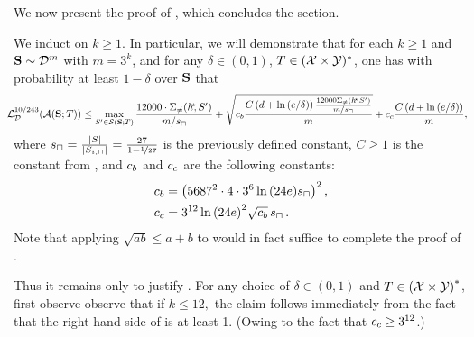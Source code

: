 We now present the proof of , which concludes the section. 

\begin{proofof}{}    
We induct on $ k\geq 1 $. 
In particular, we will demonstrate that for each $ k\geq 1$ and $\mathbf{S} \sim \mathcal{D}^m$ with $m = 3^k$, and for any $\delta \in (0, 1)$, $T \in (\mathcal{X}\times \mathcal{Y})^{*}$, one has with probability at least $ 1-\delta $ over $ \mathbf{S} $  that
\begin{align}\label{eq:upperbound5}
\hspace{-0.25 cm}
    \ls^{10/243}_{\cD}(\erm(\rS;T))\leq  \max\limits_{S'\in\cS(\rS;T)} \frac{12000 \cdot \Sigma_{\not=}(\hs\negmedspace,S')}{m/s_{\sqcap}}+\sqrt{\cb \frac{C\left(d+\ln{(e/\delta )}\right) \frac{12000\Sigma_{\not=}(\hs\negmedspace,S')}{m/s_{\sqcap}}}{m}} +\cc\frac{C\left(d+\ln{(e/\delta )}\right)}{m},
\end{align}
where $s_{\sqcap} = \frac{|S|}{|S_{i, \sqcap}|} = \frac{27}{1 - \nicefrac{1}{27}}$ is the previously defined constant, $C \geq 1$ is the constant from , and $ c_b $ and $ c_c $ are the following constants:  
\begin{align*}
    &c_b=\left(5687^2\cdot4\cdot3^{6} \ln{(24e)}s_{\sqcap}\right)^{2}, 
    \\
    &c_c=3^{12}\ln{(24e )}^{2}\sqrt{c_b} \, s_{\sqcap}\,. 
\end{align*}
Note that applying $ \sqrt{ab}\leq a+b$ to  would in fact suffice to complete the proof of .  

Thus it remains only to justify . 
For any choice of $\delta \in (0, 1)$ and $T\in\left(\mathcal{X}\times \mathcal{Y}\right)^{*} $, first observe observe that if $ k\leq 12,$ the claim follows immediately from the fact that the right hand side of  is at least 1. (Owing to the fact that $c_c\geq 3^{12}$.)


\end{proofof}
